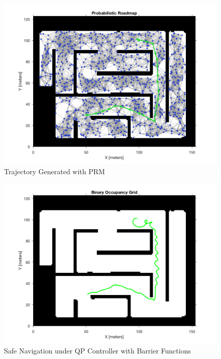 \documentclass[journal]{IEEEtran}
\begin{document}
\begin{figure}[h!]
\centering
\includegraphics[scale=0.23]{final_prm.png} 
\caption{Trajectory Generated with PRM\label{fig:prm}} 
\end{figure}
%
%
\begin{figure}[h!]
\centering
\includegraphics[scale=0.23]{thick_plot.png} 
\caption{Safe Navigation under QP Controller with Barrier Functions\label{fig:prm_works}}
\end{figure}
\end{document}
